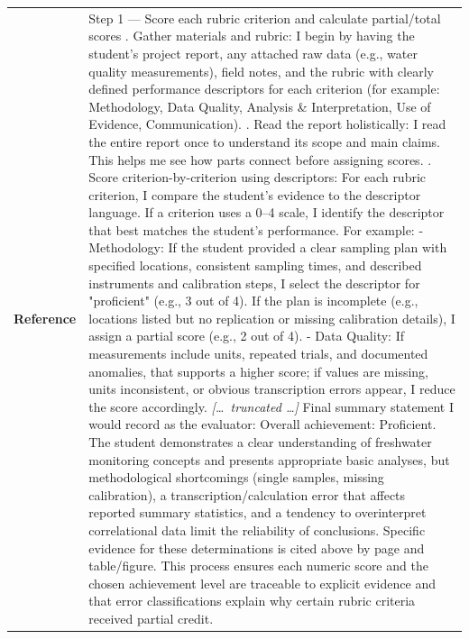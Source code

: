 \begin{longtable}{@{}l p{12.5cm}@{}}
  \textbf{Reference} & Step 1 --- Score each rubric criterion and calculate partial/total scores \newline 1. Gather materials and rubric: I begin by having the student's project report, any attached raw data (e.g., water quality measurements), field notes, and the rubric with clearly defined performance descriptors for each criterion (for example: Methodology, Data Quality, Analysis \& Interpretation, Use of Evidence, Communication). \newline 2. Read the report holistically: I read the entire report once to understand its scope and main claims. This helps me see how parts connect before assigning scores. \newline 3. Score criterion-by-criterion using descriptors: For each rubric criterion, I compare the student's evidence to the descriptor language. If a criterion uses a 0--4 scale, I identify the descriptor that best matches the student's performance. For example: \newline - Methodology: If the student provided a clear sampling plan with specified locations, consistent sampling times, and described instruments and calibration steps, I select the descriptor for "proficient" (e.g., 3 out of 4). If the plan is incomplete (e.g., locations listed but no replication or missing calibration details), I assign a partial score (e.g., 2 out of 4). \newline - Data Quality: If measurements include units, repeated trials, and documented anomalies, that supports a higher score; if values are missing, units inconsistent, or obvious transcription errors appear, I reduce the score accordingly. \newline \textit{[\ldots\ truncated \ldots]} \newline Final summary statement I would record as the evaluator: Overall achievement: Proficient. The student demonstrates a clear understanding of freshwater monitoring concepts and presents appropriate basic analyses, but methodological shortcomings (single samples, missing calibration), a transcription/calculation error that affects reported summary statistics, and a tendency to overinterpret correlational data limit the reliability of conclusions. Specific evidence for these determinations is cited above by page and table/figure. \newline This process ensures each numeric score and the chosen achievement level are traceable to explicit evidence and that error classifications explain why certain rubric criteria received partial credit. \\

\end{longtable}
